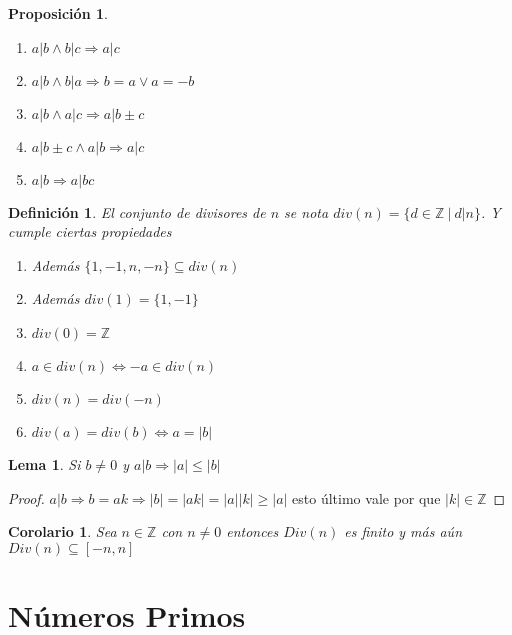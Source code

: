 \documentclass{article}
\theoremstyle{break}
\newtheorem{corollary}{Corolario}[theorem]
\newtheorem{lemma}[theorem]{Lema}
\newtheorem{proposition}{Proposición}
\newtheorem{definition}{Definición}[section]
\def \Z{\mathbb{Z}}
\begin{document}
    \begin{proposition}
        \begin{enumerate}
            \item $a|b \land b|c \Rightarrow a|c$
            \item $a|b \land b|a \Rightarrow b = a \lor a = -b$
            \item $a|b \land a|c \Rightarrow a|b\pm c$
            \item $a|b\pm c \land a|b \Rightarrow a|c$
            \item $a|b \Rightarrow a|bc$
        \end{enumerate}
    \end{proposition}

    \begin{definition}
        El conjunto de divisores de $n$ se nota $div(n) = \{d\in\Z \ | \ d|n \}$. Y cumple ciertas propiedades
        \begin{enumerate}
            \item Además $\{1,-1,n,-n\} \subseteq div(n)$
            \item Además $div(1) = \{1,-1\}$
            \item $div(0) = \Z$
            \item $a \in div(n) \iff -a \in div(n)$
            \item $div(n) = div(-n)$
            \item $div(a) = div(b) \iff a = |b|$
        \end{enumerate}
    \end{definition}
        \begin{lemma}
            Si $b\neq 0$ y $a|b \Rightarrow |a|\leq |b|$
        \end{lemma}
        \begin{proof}
            $a|b \Rightarrow b = ak \Rightarrow |b| = |ak|=|a||k| \geq |a|$ esto último vale por que $|k| \in \Z$
        \end{proof}
        
        \begin{corollary}
            Sea $n\in \Z$ con $n\neq 0$ entonces $Div(n)$ es finito y más aún $Div(n) \subseteq [-n,n]$
        \end{corollary}    

    \section{Números Primos}
\end{document}
